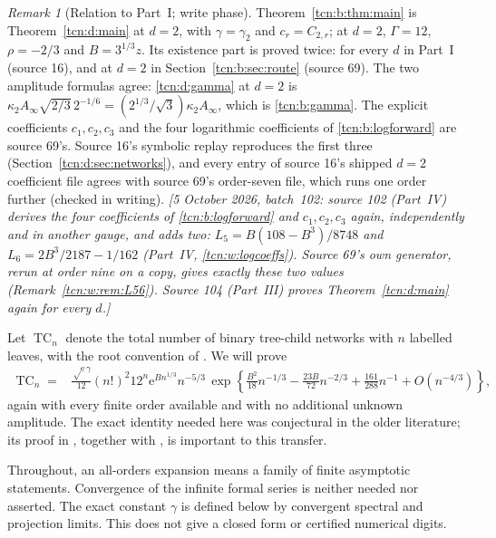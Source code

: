 \documentclass[11pt,letterpaper]{article}
\newcommand{\ee}{\mathrm e}
\newcommand{\TC}{\operatorname{TC}}
\theoremstyle{remark}
\newtheorem{remark}[theorem]{Remark}
\begin{document}
\begin{remark}[Relation to Part~I; write phase]\label{tcn:b:rem:partI}
Theorem~\ref{tcn:b:thm:main} is Theorem~\ref{tcn:d:main} at $d=2$, with $\gamma=\gamma_2$ and $c_r=C_{2,r}$; at $d=2$, $\Gamma=12$, $\rho=-2/3$ and $B=3^{1/3}z$. Its existence part is proved twice: for every $d$ in Part~I (source 16), and at $d=2$ in Section~\ref{tcn:b:sec:route} (source 69). The two amplitude formulas agree: \eqref{tcn:d:gamma} at $d=2$ is $\kappa_2A_\infty\sqrt{2/3}\,2^{-1/6}=(2^{1/3}/\sqrt3)\kappa_2A_\infty$, which is \eqref{tcn:b:gamma}. The explicit coefficients $c_1,c_2,c_3$ and the four logarithmic coefficients of \eqref{tcn:b:logforward} are source 69's. Source 16's symbolic replay reproduces the first three (Section~\ref{tcn:d:sec:networks}), and every entry of source 16's shipped $d=2$ coefficient file agrees with source 69's order-seven file, which runs one order further (checked in writing).
\emph{[5 October 2026, batch~102: source 102 (Part~IV) derives the four coefficients of \eqref{tcn:b:logforward} and $c_1,c_2,c_3$ again, independently and in another gauge, and adds two: $L_5=B(108-B^3)/8748$ and $L_6=2B^3/2187-1/162$ (Part~IV, \eqref{tcn:w:logcoeffs}). Source 69's own generator, rerun at order nine on a copy, gives exactly these two values (Remark~\ref{tcn:w:rem:L56}). Source 104 (Part~III) proves Theorem~\ref{tcn:d:main} again for every $d$.]}
\end{remark}

Let $\TC_n$ denote the total number of binary tree-child networks with $n$ labelled leaves, with the root convention of \cite{FYZ2021,Chang2024}. We will prove
\begin{equation}
\begin{split}
 \TC_n={}&\frac{\sqrt\ee\,\gamma}{12}(n!)^2 12^n
       \ee^{Bn^{1/3}}n^{-5/3}\,
 \exp\!\left\{\frac{B^2}{18}n^{-1/3}
       -\frac{23B}{72}n^{-2/3}+\frac{161}{288}n^{-1}
       +O(n^{-4/3})\right\},
\end{split}\label{tcn:b:total-forward}
\end{equation}
again with every finite order available and with no additional unknown amplitude. The exact identity needed here was conjectural in the older literature; its proof in \cite{LL2026}, together with \cite{Chang2024}, is important to this transfer.

Throughout, an all-orders expansion means a family of finite asymptotic statements. Convergence of the infinite formal series is neither needed nor asserted. The exact constant $\gamma$ is defined below by convergent spectral and projection limits. This does not give a closed form or certified numerical digits.
\end{document}

